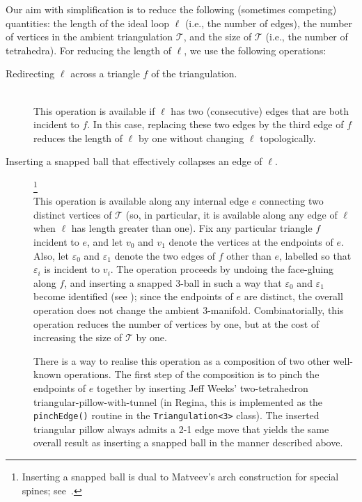 \documentclass[10pt,a4paper]{amsart}
\newcommand{\tri}{\mathcal{T}}
\begin{document}
Our aim with simplification is to reduce the following (sometimes competing) quantities:
the length of the ideal loop $\ell$ (i.e., the number of edges), the number of vertices in the ambient triangulation $\tri$, and the size of $\tri$ (i.e., the number of tetrahedra).
For reducing the length of $\ell$, we use the following operations:
\begin{description}
\item[Redirecting $\ell$ across a triangle $f$ of the triangulation.]
\hfill\\
This operation is available if $\ell$ has two (consecutive) edges that are both incident to $f$.
In this case, replacing these two edges by the third edge of $f$ reduces the length of $\ell$ by one without changing $\ell$ topologically.
\item[Inserting a snapped ball that effectively collapses an edge of $\ell$.]%
\hspace{-3pt}\footnote{Inserting a snapped ball is dual to Matveev's arch construction for special spines;
see~\cite[Section 1.1.4]{matveev2007algorithmic}.}%
\hfill\\
This operation is available along any internal edge $e$ connecting two distinct vertices of $\tri$
(so, in particular, it is available along any edge of $\ell$ when $\ell$ has length greater than one).
Fix any particular triangle $f$ incident to $e$, and let $v_0$ and $v_1$ denote the vertices at the endpoints of $e$.
Also, let $\varepsilon_0$ and $\varepsilon_1$ denote the two edges of $f$ other than $e$, labelled so that $\varepsilon_i$ is incident to $v_i$.
The operation proceeds by undoing the face-gluing along $f$, and inserting a snapped $3$-ball in such a way that $\varepsilon_0$ and $\varepsilon_1$ become identified
(see );
since the endpoints of $e$ are distinct, the overall operation does not change the ambient $3$-manifold.
Combinatorially, this operation reduces the number of vertices by one, but at the cost of increasing the size of $\tri$ by one.

There is a way to realise this operation as a composition of two other well-known operations.
The first step of the composition is to pinch the endpoints of $e$ together by inserting Jeff Weeks' two-tetrahedron triangular-pillow-with-tunnel
(in Regina, this is implemented as the \texttt{pinchEdge()} routine in the \texttt{Triangulation<3>} class).
The inserted triangular pillow always admits a 2-1 edge move that yields the same overall result as inserting a snapped ball in the manner described above.
\end{description}
\end{document}
